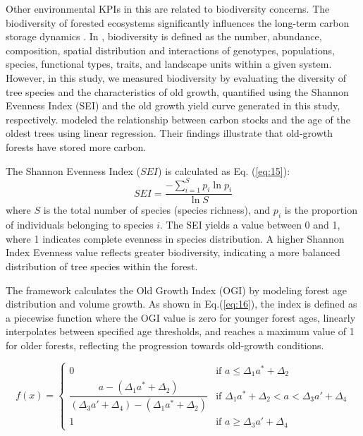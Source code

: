 \documentclass[preprint,12pt]{elsarticle}
\begin{document}
Other environmental KPIs in this are related to biodiversity concerns. The biodiversity of forested ecosystems significantly influences the long-term carbon storage dynamics \citep{Diaz2009}. In \citet{Diaz2006}, biodiversity is defined as the number, abundance, composition, spatial distribution and interactions of genotypes, populations, species, functional types, traits, and landscape units within a given system. However, in this study, we measured biodiversity by evaluating the diversity of tree species and the characteristics of old growth, quantified using the Shannon Evenness Index (SEI) \citep{Gergel2017} and the old growth yield curve generated in this study, respectively. \citet{McGarvey2015} modeled the relationship between carbon stocks and the age of the oldest trees using linear regression. Their findings illustrate that old-growth forests have stored more carbon. 

The Shannon Evenness Index (\(SEI\)) is calculated as Eq. (\ref{eq:15}):
\begin{equation}
SEI = \frac{-\sum_{i=1}^{S} p_i \ln p_i}{\ln S}
\label{eq:15}
\end{equation}
where \( S \) is the total number of species (species richness), and \( p_i \) is the proportion of individuals belonging to species \( i \).
The SEI yields a value between 0 and 1, where 1 indicates complete evenness in species distribution. A higher Shannon Index Evenness value reflects greater biodiversity, indicating a more balanced distribution of tree species within the forest.

The framework calculates the Old Growth Index (OGI) by modeling forest age distribution and volume growth. As shown in Eq.(\ref{eq:16}), the index is defined as a piecewise function where the OGI value is zero for younger forest ages, linearly interpolates between specified age thresholds, and reaches a maximum value of 1 for older forests, reflecting the progression towards old-growth conditions.

\begin{equation}
\label{eq:16}
f(x) = 
\begin{cases}
  0 & \text{if } a \leq \Delta_1 a^* + \Delta_2 \\
  \dfrac{a - (\Delta_1 a^* + \Delta_2)}{(\Delta_3 a' + \Delta_4) - (\Delta_1 a^* + \Delta_2)} & \text{if } \Delta_1 a^* + \Delta_2 < a < \Delta_3 a' + \Delta_4 \\
  1 & \text{if } a \geq \Delta_3 a' + \Delta_4
\end{cases}
\end{equation}
\end{document}
